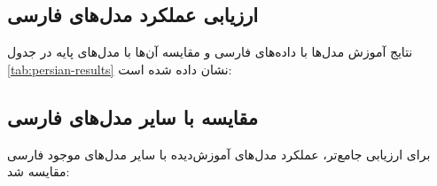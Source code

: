 \documentclass[11pt, a4paper, oneside]{book}
\begin{document}
	\subsection{ارزیابی عملکرد مدل‌های فارسی}
	نتایج آموزش مدل‌ها با داده‌های فارسی و مقایسه آن‌ها با مدل‌های پایه در جدول \ref{tab:persian-results} نشان داده شده است:

	\begin{table}[h!]
		\centering
		\caption{دقت مدل‌های آموزش‌دیده فارسی بر روی مجموعه داده‌های تست فارسی}
		\label{tab:persian-results}
		\begin{latin}
		\end{latin}
	\end{table}

	\subsection{مقایسه با سایر مدل‌های فارسی}
	برای ارزیابی جامع‌تر، عملکرد مدل‌های آموزش‌دیده با سایر مدل‌های موجود فارسی مقایسه شد:
\end{document}
